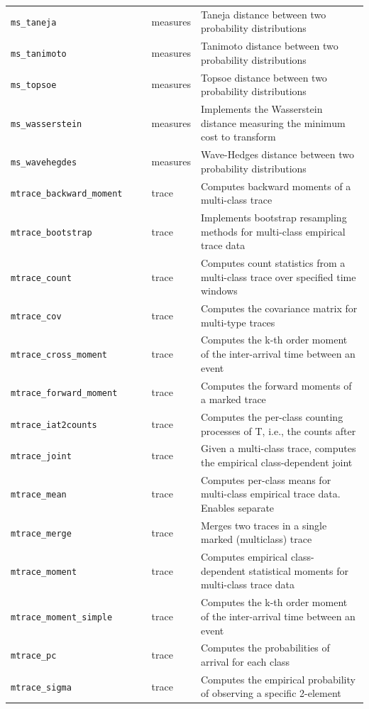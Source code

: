 \begin{footnotesize}
\begin{longtable}{|p{0.4\linewidth}|p{0.1\linewidth}|p{0.5\linewidth}|}
\texttt{ms\_taneja} & measures & Taneja distance between two probability distributions\\
\texttt{ms\_tanimoto} & measures & Tanimoto distance between two probability distributions\\
\texttt{ms\_topsoe} & measures & Topsoe distance between two probability distributions\\
\texttt{ms\_wasserstein} & measures & Implements the Wasserstein distance measuring the minimum cost to transform\\
\texttt{ms\_wavehegdes} & measures & Wave-Hedges distance between two probability distributions\\
\texttt{mtrace\_backward\_moment} & trace & Computes backward moments of a multi-class trace\\
\texttt{mtrace\_bootstrap} & trace & Implements bootstrap resampling methods for multi-class empirical trace data\\
\texttt{mtrace\_count} & trace & Computes count statistics from a multi-class trace over specified time windows\\
\texttt{mtrace\_cov} & trace & Computes the covariance matrix for multi-type traces\\
\texttt{mtrace\_cross\_moment} & trace & Computes the k-th order moment of the inter-arrival time between an event\\
\texttt{mtrace\_forward\_moment} & trace & Computes the forward moments of a marked trace\\
\texttt{mtrace\_iat2counts} & trace & Computes the per-class counting processes of T, i.e., the counts after\\
\texttt{mtrace\_joint} & trace & Given a multi-class trace, computes the empirical class-dependent joint\\
\texttt{mtrace\_mean} & trace & Computes per-class means for multi-class empirical trace data. Enables separate\\
\texttt{mtrace\_merge} & trace & Merges two traces in a single marked (multiclass) trace\\
\texttt{mtrace\_moment} & trace & Computes empirical class-dependent statistical moments for multi-class trace data\\
\texttt{mtrace\_moment\_simple} & trace & Computes the k-th order moment of the inter-arrival time between an event\\
\texttt{mtrace\_pc} & trace & Computes the probabilities of arrival for each class\\
\texttt{mtrace\_sigma} & trace & Computes the empirical probability of observing a specific 2-element\\

\end{longtable}
\end{footnotesize}
